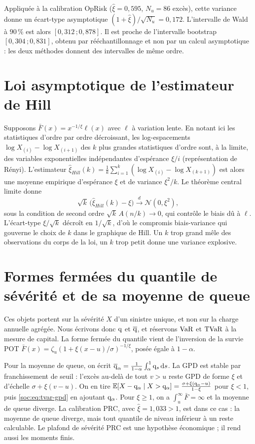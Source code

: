Appliquée à la calibration OpRisk ($\hat\xi=0{,}595$, $N_u=86$ excès), cette variance donne un écart-type
asymptotique $(1+\hat\xi)/\sqrt{N_u}=0{,}172$. L'intervalle de Wald à $90\,\%$ est alors
$[0{,}312\,;0{,}878]$. Il est proche de l'intervalle bootstrap $[0{,}304\,;0{,}831]$, obtenu par
rééchantillonnage et non par un calcul asymptotique : les deux méthodes donnent des intervalles de même ordre.

\section{Loi asymptotique de l'estimateur de Hill}
\label{soc:ann:hill}

Supposons $\bar F(x)=x^{-1/\xi}\ell(x)$ avec $\ell$ à variation lente. En notant ici les statistiques d'ordre par ordre décroissant, les log-espacements
$\log X_{(i)}-\log X_{(i+1)}$ des $k$ plus grandes statistiques d'ordre sont, à la limite, des variables
exponentielles indépendantes d'espérance $\xi/i$ (représentation de Rényi). L'estimateur
$\hat\xi_{Hill}(k)=\frac1k\sum_{i=1}^k(\log X_{(i)}-\log X_{(k+1)})$ est alors une moyenne empirique
d'espérance $\xi$ et de variance $\xi^2/k$. Le théorème central limite donne
\begin{equation}
\sqrt k\,\bigl(\hat\xi_{Hill}(k)-\xi\bigr)\xrightarrow{\;d\;}\mathcal N(0,\xi^2),
\end{equation}
sous la condition de second ordre $\sqrt k\,A(n/k)\to0$, qui contrôle le biais dû à $\ell$. L'écart-type
$\xi/\sqrt{k}$ décroît en $1/\sqrt k$, d'où le compromis biais-variance qui gouverne le choix de $k$ dans le
graphique de Hill. Un $k$ trop grand mêle des observations du corps de la loi, un $k$ trop petit donne
une variance explosive.

\section{Formes fermées du quantile de sévérité et de sa moyenne de queue}
\label{soc:ann:varestvar}

Ces objets portent sur la sévérité $X$ d'un sinistre unique, et non sur la charge annuelle agrégée. Nous
écrivons donc $\mathrm{q}$ et $\overline{\mathrm{q}}$, et réservons $\mathrm{VaR}$ et $\mathrm{TVaR}$ à la mesure de capital. La forme
fermée du quantile vient de l'inversion de la survie POT $\bar F(x)=\zeta_u(1+\xi(x-u)/\sigma)^{-1/\xi}$,
posée égale à $1-\alpha$.

Pour la moyenne de queue, on écrit $\overline{\mathrm{q}}_\alpha=\frac{1}{1-\alpha}\int_\alpha^1\mathrm{q}_s\,\mathrm{d} s$. La GPD
est stable par franchissement de seuil : l'excès au-delà de tout $v>u$ reste GPD de forme $\xi$ et d'échelle
$\sigma+\xi(v-u)$. On en tire
$\mathbb{E}[X-\mathrm{q}_\alpha\mid X>\mathrm{q}_\alpha]=\frac{\sigma+\xi(\mathrm{q}_\alpha-u)}{1-\xi}$ pour $\xi<1$, puis
\eqref{soc:eq:tvar-gpd} en ajoutant $\mathrm{q}_\alpha$. Pour $\xi\ge1$, on a $\int_u^\infty\bar F=\infty$ et la
moyenne de queue diverge. La calibration PRC, avec $\hat\xi=1{,}033>1$, est dans ce cas : la moyenne de queue diverge, mais tout quantile de niveau inférieur à un reste calculable.
Le plafond de sévérité PRC est une hypothèse économique ; il rend aussi les moments finis.

